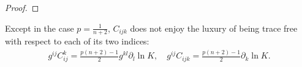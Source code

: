 \documentclass{amsart}
\newtheorem{lemma}[theorem]{Lemma}
\theoremstyle{definition}
\theoremstyle{remark}
\numberwithin{equation}{section}
\begin{document}
\begin{proof}
\end{proof}
Except in the case $ p =\frac{1}{n+2}$, $C_{ijk}$ does not enjoy the luxury of being trace free with respect to each of its two indices:
\begin{align}
g^{ij}C_{ij}^k=\frac{ p (n+2)-1}{2}g^{kl}\partial_l\ln K,\quad g^{ij}C_{ijk}=\frac{ p (n+2)-1}{2}\partial_k\ln K.
\end{align}
\end{document}
